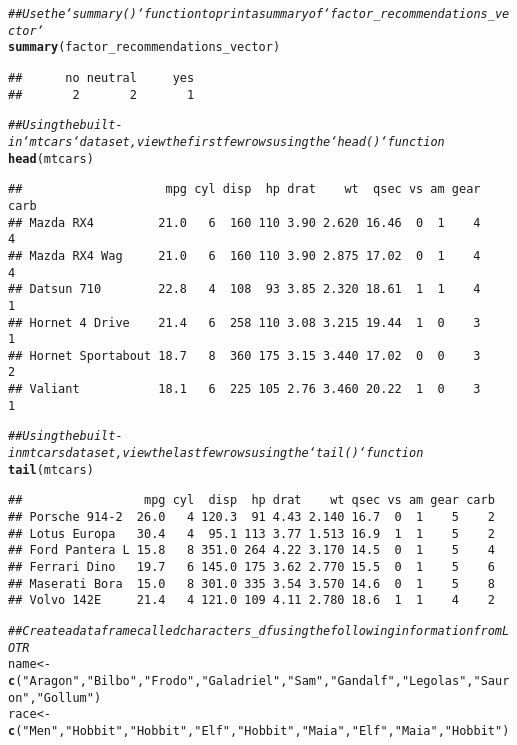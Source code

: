 \documentclass{article}\usepackage[]{graphicx}\usepackage[]{xcolor}
\makeatletter
\newcommand{\hlstr}[1]{\textcolor[rgb]{0.192,0.494,0.8}{#1}}%
\newcommand{\hlcom}[1]{\textcolor[rgb]{0.678,0.584,0.686}{\textit{#1}}}%
\newcommand{\hlstd}[1]{\textcolor[rgb]{0.345,0.345,0.345}{#1}}%
\newcommand{\hlkwb}[1]{\textcolor[rgb]{0.69,0.353,0.396}{#1}}%
\newcommand{\hlkwd}[1]{\textcolor[rgb]{0.737,0.353,0.396}{\textbf{#1}}}%
\newenvironment{kframe}{%
 \def\at@end@of@kframe{}%
 \ifinner\ifhmode%
  \def\at@end@of@kframe{\end{minipage}}%
  \begin{minipage}{\columnwidth}%
 \fi\fi%
 \def\FrameCommand##1{\hskip\@totalleftmargin \hskip-\fboxsep
 \colorbox{shadecolor}{##1}\hskip-\fboxsep
     \hskip-\linewidth \hskip-\@totalleftmargin \hskip\columnwidth}%
 \MakeFramed {\advance\hsize-\width
   \@totalleftmargin\z@ \linewidth\hsize
   \@setminipage}}%
 {\par\unskip\endMakeFramed%
 \at@end@of@kframe}
\newenvironment{knitrout}{}{} %
\makeatother
\begin{document}
\begin{knitrout}
\begin{kframe}
\begin{alltt}
\hlcom{## Use the `summary()` function to print a summary of `factor_recommendations_vector`}
\hlkwd{summary}\hlstd{(factor_recommendations_vector)}
\end{alltt}
\begin{verbatim}
##      no neutral     yes 
##       2       2       1
\end{verbatim}
\begin{alltt}
\hlcom{## Using the built-in `mtcars` dataset, view the first few rows using the `head()` function}
\hlkwd{head}\hlstd{(mtcars)}
\end{alltt}
\begin{verbatim}
##                    mpg cyl disp  hp drat    wt  qsec vs am gear carb
## Mazda RX4         21.0   6  160 110 3.90 2.620 16.46  0  1    4    4
## Mazda RX4 Wag     21.0   6  160 110 3.90 2.875 17.02  0  1    4    4
## Datsun 710        22.8   4  108  93 3.85 2.320 18.61  1  1    4    1
## Hornet 4 Drive    21.4   6  258 110 3.08 3.215 19.44  1  0    3    1
## Hornet Sportabout 18.7   8  360 175 3.15 3.440 17.02  0  0    3    2
## Valiant           18.1   6  225 105 2.76 3.460 20.22  1  0    3    1
\end{verbatim}
\begin{alltt}
\hlcom{## Using the built-in mtcars dataset, view the last few rows using the `tail()` function}
\hlkwd{tail}\hlstd{(mtcars)}
\end{alltt}
\begin{verbatim}
##                 mpg cyl  disp  hp drat    wt qsec vs am gear carb
## Porsche 914-2  26.0   4 120.3  91 4.43 2.140 16.7  0  1    5    2
## Lotus Europa   30.4   4  95.1 113 3.77 1.513 16.9  1  1    5    2
## Ford Pantera L 15.8   8 351.0 264 4.22 3.170 14.5  0  1    5    4
## Ferrari Dino   19.7   6 145.0 175 3.62 2.770 15.5  0  1    5    6
## Maserati Bora  15.0   8 301.0 335 3.54 3.570 14.6  0  1    5    8
## Volvo 142E     21.4   4 121.0 109 4.11 2.780 18.6  1  1    4    2
\end{verbatim}
\begin{alltt}
\hlcom{## Create a dataframe called characters_df using the following information from LOTR}
\hlstd{name} \hlkwb{<-} \hlkwd{c}\hlstd{(}\hlstr{"Aragon"}\hlstd{,} \hlstr{"Bilbo"}\hlstd{,} \hlstr{"Frodo"}\hlstd{,} \hlstr{"Galadriel"}\hlstd{,} \hlstr{"Sam"}\hlstd{,} \hlstr{"Gandalf"}\hlstd{,} \hlstr{"Legolas"}\hlstd{,} \hlstr{"Sauron"}\hlstd{,} \hlstr{"Gollum"}\hlstd{)}
\hlstd{race} \hlkwb{<-} \hlkwd{c}\hlstd{(}\hlstr{"Men"}\hlstd{,} \hlstr{"Hobbit"}\hlstd{,} \hlstr{"Hobbit"}\hlstd{,} \hlstr{"Elf"}\hlstd{,} \hlstr{"Hobbit"}\hlstd{,} \hlstr{"Maia"}\hlstd{,} \hlstr{"Elf"}\hlstd{,} \hlstr{"Maia"}\hlstd{,} \hlstr{"Hobbit"}\hlstd{)}

\end{alltt}
\end{kframe}
\end{knitrout}
\end{document}
